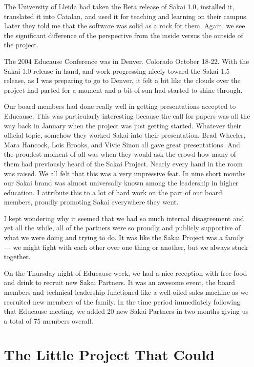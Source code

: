 \documentclass[12pt]{book}
\begin{document}
The University of Lleida had taken the
Beta release of Sakai 1.0, installed it, translated it
into Catalan, and used it for teaching and
learning on their campus.  Later they told
me that the software was solid as a rock for them.
Again, we see the significant difference of the perspective
from the inside versus the outside of the
project.

The 2004 Educause Conference was in Denver, Colorado
October 18-22.  With the Sakai 1.0 release in hand,
and work progressing nicely toward the Sakai 1.5
release, as I was preparing to go to Denver,
it felt a bit like the clouds over the project
had parted for a moment and a bit of sun had
started to shine through.

Our board members had done really well in getting
presentations accepted to Educause.  This was particularly
interesting because the call for papers was all
the way back in January when the project was just
getting started.  Whatever their official topic,
somehow they worked Sakai into their presentation.
Brad Wheeler, Mara Hancock, Lois Brooks, and Vivie Sinou
all gave great presentations.  And the proudest moment of all
was when they would ask the crowd how many of them
had previously heard of the Sakai Project.
Nearly every hand in the room was raised.
We all felt that this was a very impressive feat.
In nine short months our Sakai brand was almost universally
known among the leadership in higher education.
I attribute this to a lot of hard work on the part
of our board members, proudly promoting Sakai
everywhere they went.

I kept wondering why it seemed that we had
so much internal disagreement and yet all the
while, all of the partners were so proudly and
publicly supportive of what we were doing and
trying to do.  It was like the Sakai Project was
a family --- we might fight with each other over one thing
or another, but we always stuck together.

On the Thursday night of Educause week, we had a nice
reception with free food and drink to recruit
new Sakai Partners.  It was an awesome event, the
board members and technical leadership functioned like a
well-oiled sales machine as we recruited new members
of the family.
In the time period immediately following that Educause
meeting, we added 20 new Sakai Partners in two months
giving us a total of 75 members overall.

\chapter{The Little Project That Could}
\end{document}
